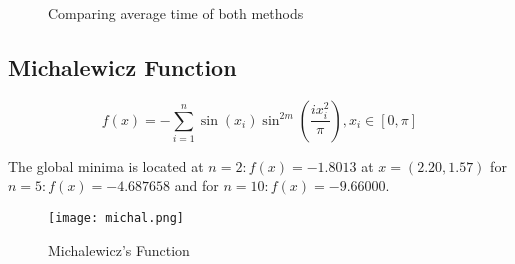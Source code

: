 \documentclass{article}
\begin{document}
\begin{figure}[H]%
  \centering %
\caption{Comparing average time of both methods}
\end{figure}

\subsection{Michalewicz Function\cite{michal}}

$$
f(x) = - \sum_{i=1}^n \sin \left(x_i \right)\sin^{2m}\left(\frac{ix_i^2}{\pi}\right),
x_i \in \left[ 0 , \pi \right]$$

The global minima is located at $ n=2: f (x) = -1.8013$ at  $x = \left(2.20,1.57\right)$
for $n=5: f (x) = -4.687658$ and for $n=10: f (x) = -9.66000$.

\begin{figure}[!h]
  \centering
  \texttt{[image: michal.png]}
  \caption{Michalewicz's Function\cite{michal_img}}
\end{figure}
\end{document}
